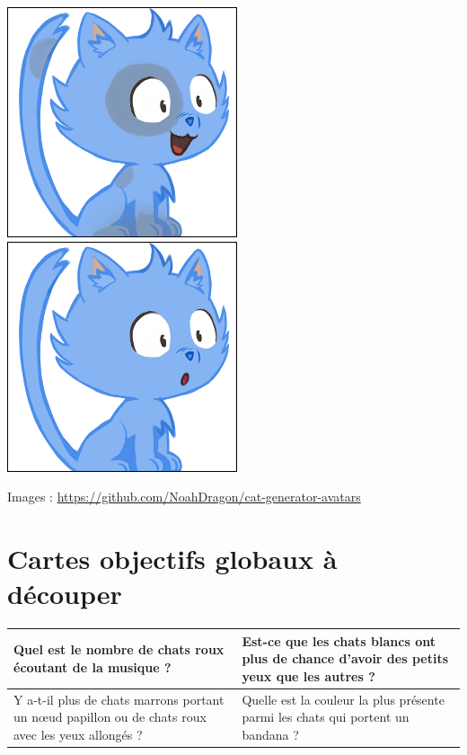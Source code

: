 \documentclass[a4paper, 12pt]{article}
\begin{document}
  \includegraphics[scale=0.45]{out/33.png}
  \includegraphics[scale=0.45]{out/18.png}




  Images : \url{https://github.com/NoahDragon/cat-generator-avatars}

\section*{Cartes objectifs globaux à découper}

\begin{center}

	\begin{tabular}{|>{\centering\arraybackslash}p{7cm}|>{\centering\arraybackslash}p{7cm}|}
	\hline \vspace{2mm}
	\Large{Quel est le nombre de chats roux écoutant de la musique ?} \vspace{2mm}& \vspace{2mm} \Large{Est-ce que les chats blancs ont plus de chance d'avoir des petits yeux que les autres ?} \vspace{2mm} \\
\hline \vspace{2mm}
	\Large{Y a-t-il plus de chats marrons portant un nœud papillon ou de chats roux avec les yeux allongés ?} \vspace{2mm}& \vspace{2mm} \Large{Quelle est la couleur la plus présente parmi les chats qui portent un bandana ?} \vspace{2mm} \\
	\hline
	\end{tabular}

\end{center}
\end{document}
